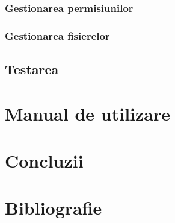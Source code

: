 \documentclass[12pt]{article}
\begin{document}
\subsubsection{Gestionarea permisiunilor}
\subsubsection{Gestionarea fisierelor}

\subsection{Testarea}

\section{Manual de utilizare}

\section{Concluzii}

\newpage

\section{Bibliografie}
\nocite{owasp-top10-2017}
\nocite{owasp-top10-mobile}
\nocite{3ways-auth}

\nocite{liu2016follow}
\nocite{ssidloc}
\nocite{googleperm}
\nocite{redditcalc}

\nocite{rfc-7519}
\nocite{jwt}
\nocite{enisa-2017}
\nocite{enisa-security-data-processing}
\nocite{goldberg1998comparison}
\nocite{felt2017measuring}
\nocite{fette2011websocket}
\nocite{erkkila2012websocket}
\nocite{test-ws}

\nocite{katz1996handbook}
\nocite{tutrsa}
\nocite{jonsson2003public}

\nocite{kahn2010mobile}
\nocite{barton2012regulation}

\nocite{masse2011rest}
\nocite{tilkov2010node}
\nocite{reqpersec}

\printbibliography[title=Bibliografie]
\end{document}
